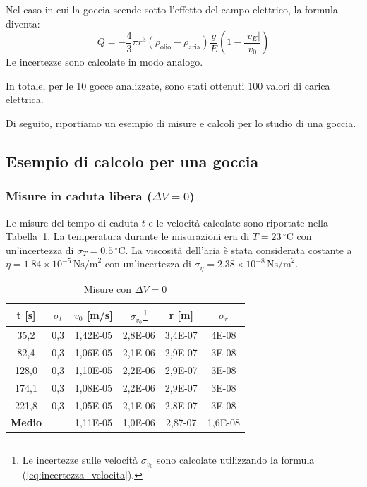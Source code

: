 \documentclass[a4paper,12pt]{article}
\begin{document}
Nel caso in cui la goccia scende sotto l'effetto del campo elettrico, la formula diventa:
\begin{equation}
Q= -\frac{4}{3} \pi r^3 (\rho_{\text{olio}} - \rho_{\text{aria}}) \frac{g}{E} \left(1 - \frac{|v_E|}{v_0}\right)
\label{eq:carica_goccia_scende}
\end{equation}
Le incertezze sono calcolate in modo analogo.

In totale, per le 10 gocce analizzate, sono stati ottenuti 100 valori di carica elettrica.

Di seguito, riportiamo un esempio di misure e calcoli per lo studio di una goccia.

\subsection{Esempio di calcolo per una goccia}

\subsubsection{Misure in caduta libera (\( \Delta V = 0 \))}

Le misure del tempo di caduta \( t \) e le velocità calcolate sono riportate nella Tabella~\ref{tab:caduta_libera}. La temperatura durante le misurazioni era di \( T = 23 \, ^\circ\text{C} \) con un'incertezza di \( \sigma_T = 0.5 \, ^\circ\text{C} \). La viscosità dell'aria è stata considerata costante a \( \eta = 1.84 \times 10^{-5} \, \text{Ns/m}^2 \) con un'incertezza di \( \sigma_\eta = 2.38 \times 10^{-8} \, \text{Ns/m}^2 \).

\begin{table}[H]
    \centering
    \caption{Misure con $\Delta V = 0$}
    \label{tab:caduta_libera}
    \begin{tabular}{cccccc}
    \toprule
    \textbf{t [s]} & \textbf{$\sigma_t$} & \textbf{$v_0$ [m/s]} & \textbf{$\sigma_{v_0}$}\footnote{Le incertezze sulle velocità \( \sigma_{v_0} \) sono calcolate utilizzando la formula (\ref{eq:incertezza_velocita}).} & \textbf{r [m]} & \textbf{$\sigma_r$} \\
    \midrule
    35,2 & 0,3 & 1,42E-05 & 2,8E-06 & 3,4E-07 & 4E-08 \\
    82,4 & 0,3 & 1,06E-05 & 2,1E-06 & 2,9E-07 & 3E-08 \\
    128,0 & 0,3 & 1,10E-05 & 2,2E-06 & 2,9E-07 & 3E-08 \\
    174,1 & 0,3 & 1,08E-05 & 2,2E-06 & 2,9E-07 & 3E-08 \\
    221,8 & 0,3 & 1,05E-05 & 2,1E-06 & 2,8E-07 & 3E-08 \\
    \midrule
    \textbf{Medio} & & 1,11E-05 & 1,0E-06 & 2,87-07 & 1,6E-08 \\
    \bottomrule
    \end{tabular}
\end{table}
\end{document}
